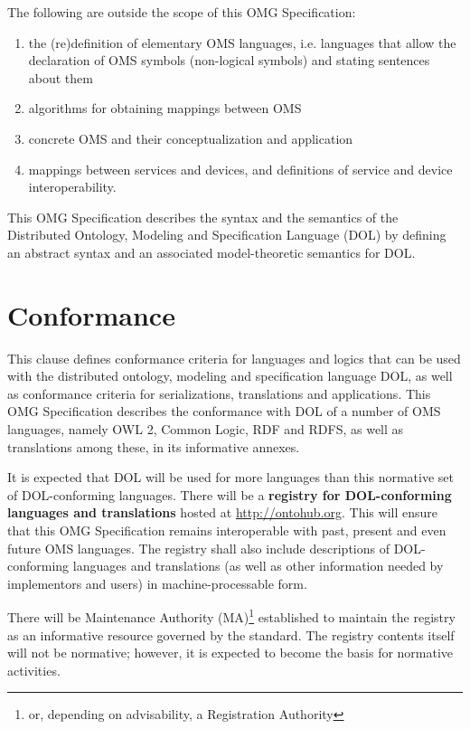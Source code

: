 \documentclass[10pt,fleqn,%
\ifpretendfinal
final%
\else
draft%
\fi,
]{scrreprt}
\makeatletter
\newcommand*{\ie}{i.e.\@\xspace}
\newcommand*\CommentAuthor{}
\renewcommand*\CommentAuthor{#1}}
\newcommand*\CommentDate{}
\renewcommand*\CommentDate{#1}}
\newcommand*\CommentId{}
\renewcommand*\CommentId{#1}}
\newcommand*\CommentType{}
\renewcommand*\CommentType{#1}}
\newcommand*{\SetCommentColorByType}[1]{%
\edef\localType{{#1}}%
\expandafter\ifstrequal\localType{q-aut}{\colorlet{CommentColor}{red}}{%
\expandafter\ifstrequal\localType{q-all}{\colorlet{CommentColor}{orange}}{%
\expandafter\ifstrequal\localType{todo}{\colorlet{CommentColor}{orange}}{%
\expandafter\ifstrequal\localType{fyi}{\colorlet{CommentColor}{lightgray}}{%
\colorlet{CommentColor}{yellow}}}}}}
\newcommand*{\SetCommentPrefixByType}[1]{%
\edef\localType{{#1}}%
\expandafter\@ifmtarg\localType{%
\edef\CommentPrefix{}%
}{%
\caseupper[q]{#1}%
\edef\CommentPrefix{\thestring: }%
}}
\newcommand*{\initComment}[1]{%
\setkeys{Comment}{#1}%
\SetCommentColorByType{\CommentType}%
\relax%
\SetCommentPrefixByType{\CommentType}%
\relax%
}
\newcommand*{\todonote}[2][]{%
\initComment{#1}%
\pdfcomment[author=\CommentAuthor,color=CommentColor,date=\CommentDate,id=\CommentId]{%
\CommentPrefix
#2}}
\renewcommand*{\todonote}[2][]{%
\initComment{#1}%
\ednote{\CommentPrefix #2}}
\newcommand*{\termref}[1]{\index{#1}#1\xspace}
\newcommand*{\IS}{OMG Specification\xspace}
\makeatother
\begin{document}
The following are outside the scope of this \IS:
\begin{enumerate}
\item the (re)definition of elementary OMS languages, \ie languages that allow the declaration of OMS symbols (non-logical symbols) 
and
stating sentences about them
\item algorithms for obtaining mappings between OMS
\item concrete OMS and their conceptualization and application
\item mappings between services and devices, and definitions of service and device interoperability.
\end{enumerate}

This \IS describes the syntax and the semantics of the Distributed Ontology, Modeling and
Specification Language (DOL) by defining an abstract syntax and an associated model-theoretic
semantics for DOL. 


\chapter{Conformance}\label{c:conformance}
This clause defines conformance criteria for languages and logics that can be used with the
distributed ontology, modeling and specification language DOL, as well as conformance criteria for
serializations, translations and applications. This \IS describes the conformance with DOL of a
number of OMS languages, namely OWL 2, Common Logic, RDF and RDFS, as well as translations among
these, in its informative annexes.

It is expected that DOL will be used for more languages than this normative set of DOL-conforming
languages. There will be a \textbf{\termref{registry} for DOL-conforming languages and translations} hosted
at \url{http://ontohub.org}.  This will ensure that this \IS remains interoperable with past,
present and even future OMS languages.  The registry shall also include descriptions of
DOL-conforming languages and translations (as well as other information needed by implementors
and users) in machine-processable form.  

There will be Maintenance Authority (MA)\footnote{or, depending on advisability, a Registration
Authority} established to maintain the registry as an informative resource governed by the
standard.  The registry contents itself will not be normative; however, it is 
expected to become the basis for normative activities.
\end{document}
